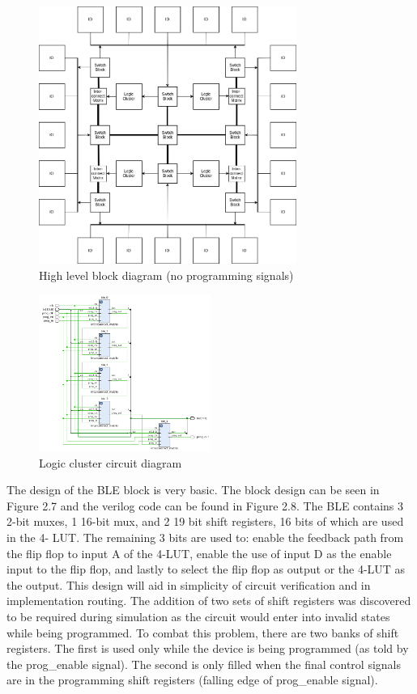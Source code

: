 \documentclass[12pt]{article}
\begin{document}
\begin{figure}[ht]
    \centering
    \includegraphics[width=0.75\textwidth]{arch}
    \caption{High level block diagram (no programming signals)}
    \label{fig:arch}
\end{figure}

\begin{figure}[ht]
    \centering
    \includegraphics[width=0.5\textwidth]{circuit_toplevel}
    \caption{Logic cluster circuit diagram}
    \label{fig:circuit_toplevel}
\end{figure}

The design of the BLE block is very basic. The block design can be seen in Figure 
2.7 and the verilog code can be found in Figure 2.8. The BLE contains 3 2-bit muxes,
1 16-bit mux, and 2 19 bit shift registers, 16 bits of which are used in the 4-
LUT. The remaining 3 bits are used to: enable the feedback path from the flip flop 
to input A of the 4-LUT, enable the use of input D as the enable input to the flip 
flop, and lastly to select the flip flop as output or the 4-LUT as the output. This 
design will aid in simplicity of circuit verification and in implementation routing.
The addition of two sets of shift registers was discovered to be required during 
simulation as the circuit would enter into invalid states while being programmed. 
To combat this problem, there are two banks of shift registers. The first is used 
only while the device is being programmed (as told by the prog{\_}enable signal). The 
second is only filled when the final control signals are in the programming shift 
registers (falling edge of prog{\_}enable signal).
\end{document}

